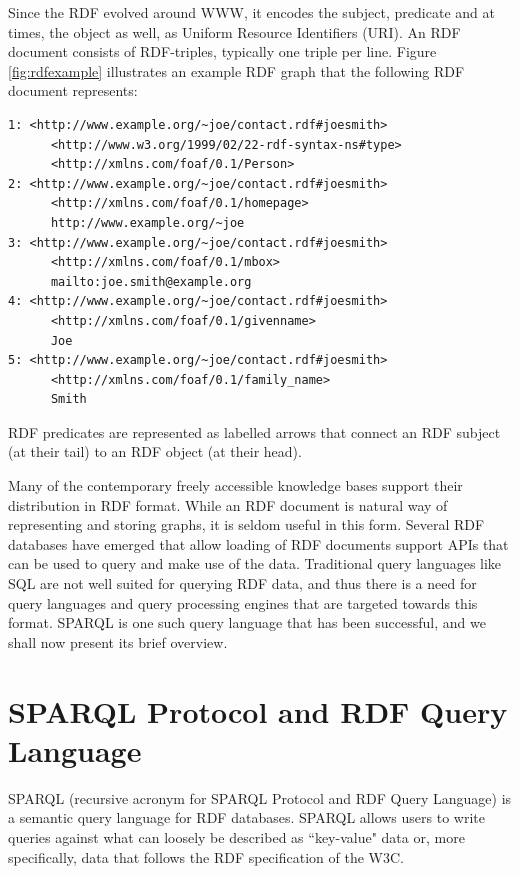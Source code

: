 \documentclass[a4paper, twoside, 12pt]{report}
\begin{document}
Since the RDF evolved around WWW, it encodes the subject, predicate and at times, the object as well, as Uniform Resource Identifiers (URI). An RDF document consists of RDF-triples, typically one triple per line. Figure \ref{fig:rdfexample} illustrates an example RDF graph that the following RDF document represents:

\begin{verbatim}
1: <http://www.example.org/~joe/contact.rdf#joesmith>
      <http://www.w3.org/1999/02/22-rdf-syntax-ns#type>
      <http://xmlns.com/foaf/0.1/Person>
2: <http://www.example.org/~joe/contact.rdf#joesmith>
      <http://xmlns.com/foaf/0.1/homepage>
      http://www.example.org/~joe
3: <http://www.example.org/~joe/contact.rdf#joesmith>
      <http://xmlns.com/foaf/0.1/mbox>
      mailto:joe.smith@example.org
4: <http://www.example.org/~joe/contact.rdf#joesmith>
      <http://xmlns.com/foaf/0.1/givenname>
      Joe
5: <http://www.example.org/~joe/contact.rdf#joesmith>
      <http://xmlns.com/foaf/0.1/family_name>
      Smith
\end{verbatim}

RDF predicates are represented as labelled arrows that connect an RDF subject (at their tail) to an RDF object (at their head).

Many of the contemporary freely accessible knowledge bases support their distribution in RDF format. While an RDF document is natural way of representing and storing graphs, it is seldom useful in this form. Several RDF databases have emerged that allow loading of RDF documents support APIs that can be used to query and make use of the data. Traditional query languages like SQL are not well suited for querying RDF data, and thus there is a need for query languages and query processing engines that are targeted towards this format. SPARQL is one such query language that has been successful, and we shall now present its brief overview.


\section[SPARQL]{SPARQL Protocol and RDF Query Language}

SPARQL\cite{prud2008sparql} (recursive acronym for SPARQL Protocol and RDF Query Language) is a semantic query language for RDF databases. SPARQL allows users to write queries against what can loosely be described as ``key-value" data or, more specifically, data that follows the RDF specification of the W3C.
\end{document}
